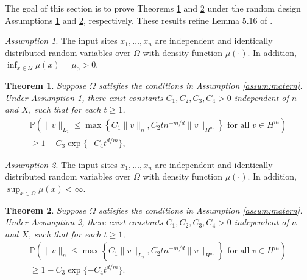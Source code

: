 \documentclass[12pt]{article}
\theoremstyle{plain}
\newtheorem{theorem}{Theorem}
\theoremstyle{remark}
\newtheorem{assumption}{Assumption}
\begin{document}
The goal of this section is to prove Theorems \ref{th:randomdesign1} and \ref{th:randomdesign2} under the random design Assumptions \ref{assum:random1} and \ref{assum:random2}, respectively. These results refine Lemma 5.16 of \cite{geer2000empirical}.

\begin{assumption}\label{assum:random1}
    The input sites $x_1,\ldots,x_n$ are independent and identically distributed random variables over $\Omega$ with density function $\mu(\cdot)$. In addition, $\inf_{x\in\Omega}\mu(x)=\mu_0>0$.
\end{assumption}


\begin{theorem}\label{th:randomdesign1}
Suppose $\Omega$ satisfies the conditions in Assumption \ref{assum:matern}.
    Under Assumption \ref{assum:random1}, there exist constants $C_1,C_2,C_3,C_4>0$ independent of $n$ and $X$, such that for each $t\geq 1$,
        \begin{multline}
         \mathbb{P}\left(\|v\|_{L_2}\leq \max\left\{ C_1 \|v\|_{n},C_2 t n^{-m/d}\|v\|_{H^m}\right\} \text{ for all } v\in H^m\right)\\ \geq 1-C_3\exp\{-C_4 t^{d/m}\},\label{l2_to_nTH}
    \end{multline}
\end{theorem}

\begin{assumption}\label{assum:random2}
    The input sites $x_1,\ldots,x_n$ are independent and identically distributed random variables over $\Omega$ with density function $\mu(\cdot)$. In addition, $\sup_{x\in\Omega}\mu(x)<\infty$.
\end{assumption}


\begin{theorem}\label{th:randomdesign2}
Suppose $\Omega$ satisfies the conditions in Assumption \ref{assum:matern}.
    Under Assumption \ref{assum:random2}, there exist constants $C_1,C_2,C_3,C_4>0$ independent of $n$ and $X$, such that for each $t\geq 1$,
        \begin{multline}
         \mathbb{P}\left(\|v\|_{n}\leq \max\left\{C_1 \|v\|_{L_2},C_2 t n^{-m/d}\|v\|_{H^m}\right\} \text{ for all } v\in H^m\right)\\ \geq 1-C_3\exp\{-C_4 t^{d/m}\}.\label{n_to_l2TH}
    \end{multline}
\end{theorem}

\end{document}
